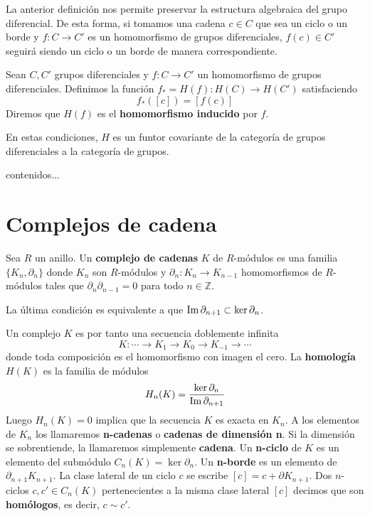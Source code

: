 La anterior definición nos permite preservar la estructura algebraica del grupo diferencial. De esta forma, si tomamos una cadena $c \in C$ que sea un ciclo o un borde y $f:C \rightarrow C'$ es un homomorfismo de grupos diferenciales, $f(c) \in C'$ seguirá siendo un ciclo o un borde de manera correspondiente.

\begin{definicion}
	Sean $C, C'$ grupos diferenciales y $f:C \rightarrow C'$ un homomorfismo de grupos diferenciales. Definimos la función $f_* = H(f): H(C) \rightarrow H(C')$ satisfaciendo 
	\[f_*([c]) = [f(c)] \]
	Diremos que $H(f)$ es el \textbf{homomorfismo inducido} por $f$.
\end{definicion}

En estas condiciones, $H$ es un funtor covariante de la categoría de grupos diferenciales a la categoría de grupos.

\begin{ejemplo}
	contenidos...
\end{ejemplo}

\section{Complejos de cadena}

\begin{definicion}
	Sea $R$ un anillo. Un \textbf{complejo de cadenas} $K$ de $R$-módulos es una familia $\{K_n, \partial_n\}$ donde $K_n$ son $R$-módulos y $\partial_n : K_n \rightarrow K_{n-1}$ homomorfismos de $R$-módulos tales que $\partial_n \partial_{n-1} = 0$ para todo $n \in \mathbb{Z}$.
\end{definicion}

La última condición es equivalente a que $\operatorname{Im}{\partial_{n+1}} \subset \ker{\partial_n}$.

Un complejo $K$  es por tanto una secuencia doblemente infinita
\[ K : \cdots \rightarrow K_{1} \rightarrow K_0 \rightarrow K_{-1} \rightarrow \cdots \]
donde toda composición es el homomorfismo con imagen el cero. La \textbf{homología} $H(K)$ es la familia de módulos
\[ H_n(K) = \frac{\ker \partial_n}{\operatorname{Im} \partial_{n+1}} \]
Luego $H_n(K)=0$ implica que la secuencia $K$ es exacta en $K_n$. A los elementos de $K_n$ los llamaremos \textbf{n-cadenas} o \textbf{cadenas de dimensión n}. Si la dimensión se sobrentiende, la llamaremos simplemente \textbf{cadena}. Un \textbf{n-ciclo} de $K$ es un elemento del submódulo $C_n(K) = \ker \partial_n$. Un \textbf{n-borde} es un elemento de $\partial_{n+1}K_{n+1}$. La clase lateral de un ciclo $c$ se escribe $[c] = c + \partial K_{n+1}$. Dos $n$-ciclos $c,c' \in C_n(K)$ pertenecientes a la misma clase lateral $[c]$ decimos que son \textbf{homólogos}, es decir, $c \sim c'$.

